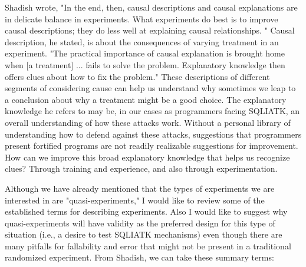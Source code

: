 Shadish wrote, "In the end, then, causal descriptions and causal explanations are in delicate balance in experiments. What experiments do best is to improve causal descriptions; they do less well at explaining causal relationships. " Causal description, he stated, is about the consequences of varying treatment in an experiment. "The practical importance of causal explanation is brought home when [a treatment] ... fails to solve the problem. Explanatory knowledge then offers clues about how to fix the problem." These descriptions of different segments of considering cause can help us understand why sometimes we leap to a conclusion about why a treatment might be a good choice. The explanatory knowledge he refers to may be, in our cases as programmers facing SQLIATK, an overall understanding of how these attacks work. Without a personal library of understanding how to defend against these attacks, suggestions that programmers present fortified programs are not readily realizable suggestions for improvement. How can we improve this broad explanatory knowledge that helps us recognize clues? Through training and experience, and also through experimentation.

Although we have already mentioned that the types of experiments we are interested in are "quasi-experiments," I would like to review some of the established terms for describing experiments. Also I would like to suggest why quasi-experiments will have validity as the preferred design for this type of situation (i.e., a desire to test SQLIATK mechanisms) even though there are many pitfalls for fallability and error that might not be present in a traditional randomized experiment. From Shadish, we can take these summary terms:

